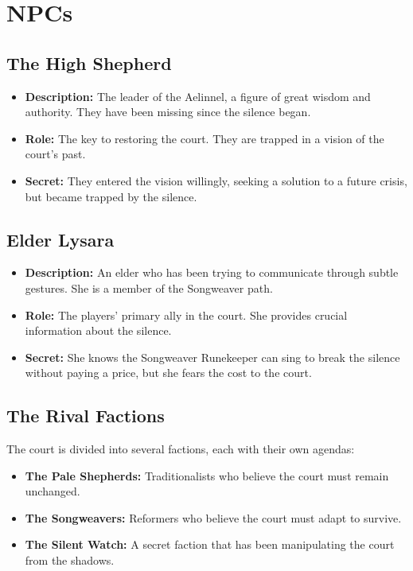 \documentclass{article}
\begin{document}
\section{NPCs}

\subsection{The High Shepherd}

\begin{itemize}
    \item \textbf{Description:} The leader of the Aelinnel, a figure of great wisdom and authority. They have been missing since the silence began.
    \item \textbf{Role:} The key to restoring the court. They are trapped in a vision of the court's past.
    \item \textbf{Secret:} They entered the vision willingly, seeking a solution to a future crisis, but became trapped by the silence.
\end{itemize}

\subsection{Elder Lysara}

\begin{itemize}
    \item \textbf{Description:} An elder who has been trying to communicate through subtle gestures. She is a member of the Songweaver path.
    \item \textbf{Role:} The players' primary ally in the court. She provides crucial information about the silence.
    \item \textbf{Secret:} She knows the Songweaver Runekeeper can sing to break the silence without paying a price, but she fears the cost to the court.
\end{itemize}

\subsection{The Rival Factions}

The court is divided into several factions, each with their own agendas:

\begin{itemize}
    \item \textbf{The Pale Shepherds:} Traditionalists who believe the court must remain unchanged.
    \item \textbf{The Songweavers:} Reformers who believe the court must adapt to survive.
    \item \textbf{The Silent Watch:} A secret faction that has been manipulating the court from the shadows.
\end{itemize}
\end{document}
